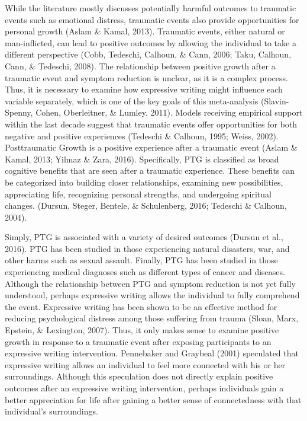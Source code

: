 \documentclass[english,man]{apa6}
\theoremstyle{definition}
\theoremstyle{definition}
\theoremstyle{definition}
\theoremstyle{remark}
\begin{document}
While the literature mostly discusses potentially harmful outcomes to
traumatic events such as emotional distress, traumatic events also
provide opportunities for personal growth (Aslam \& Kamal, 2013).
Traumatic events, either natural or man-inflicted, can lead to positive
outcomes by allowing the individual to take a different perspective
(Cobb, Tedeschi, Calhoun, \& Cann, 2006; Taku, Calhoun, Cann, \&
Tedeschi, 2008). The relationship between positive growth after a
traumatic event and symptom reduction is unclear, as it is a complex
process. Thus, it is necessary to examine how expressive writing might
influence each variable separately, which is one of the key goals of
this meta-analysis (Slavin-Spenny, Cohen, Oberleitner, \& Lumley, 2011).
Models receiving empirical support within the last decade suggest that
traumatic events offer opportunities for both negative and positive
experiences (Tedeschi \& Calhoun, 1995; Weiss, 2002). Posttraumatic
Growth is a positive experience after a traumatic event (Aslam \& Kamal,
2013; Yilmaz \& Zara, 2016). Specifically, PTG is classified as broad
cognitive benefits that are seen after a traumatic experience. These
benefits can be categorized into building closer relationships,
examining new possibilities, appreciating life, recognizing personal
strengths, and undergoing spiritual changes. (Dursun, Steger, Bentele,
\& Schulenberg, 2016; Tedeschi \& Calhoun, 2004).

Simply, PTG is associated with a variety of desired outcomes (Dursun et
al., 2016). PTG has been studied in those experiencing natural
disasters, war, and other harms such as sexual assault. Finally, PTG has
been studied in those experiencing medical diagnoses such as different
types of cancer and diseases. Although the relationship between PTG and
symptom reduction is not yet fully understood, perhaps expressive
writing allows the individual to fully comprehend the event. Expressive
writing has been shown to be an effective method for reducing
psychological distress among those suffering from trauma (Sloan, Marx,
Epstein, \& Lexington, 2007). Thus, it only makes sense to examine
positive growth in response to a traumatic event after exposing
participants to an expressive writing intervention. Pennebaker and
Graybeal (2001) speculated that expressive writing allows an individual
to feel more connected with his or her surroundings. Although this
speculation does not directly explain positive outcomes after an
expressive writing intervention, perhaps individuals gain a better
appreciation for life after gaining a better sense of connectedness with
that individual's surroundings.
\end{document}
